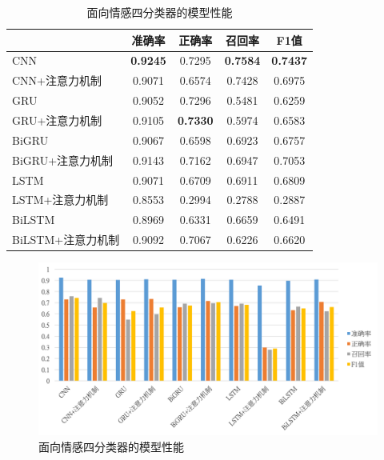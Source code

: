 \begin{table}[htb]
  \centering
  \begin{minipage}[t]{0.8\linewidth}
  \caption{面向情感四分类器的模型性能}
  \label{tab:exp_context_emo_0_result}
    \begin{tabularx}{\linewidth}{X|cccc}
    \toprule[1.5pt]
    & 准确率 & 正确率 & 召回率 & F1值 \\
    \hline
    CNN & \bf 0.9245 & 0.7295 & \bf 0.7584 & \bf 0.7437 \\ %
    CNN+注意力机制 & 0.9071 & 0.6574 & 0.7428 & 0.6975 \\ %
    \hline
    GRU & 0.9052 & 0.7296 & 0.5481 & 0.6259 \\ %
    GRU+注意力机制 & 0.9105 & \bf 0.7330 & 0.5974 & 0.6583 \\ %
    \hline
    BiGRU & 0.9067 & 0.6598 & 0.6923 & 0.6757 \\ %
    BiGRU+注意力机制 & 0.9143 & 0.7162 & 0.6947 & 0.7053 \\ %
    \hline
    LSTM & 0.9071 & 0.6709 & 0.6911 & 0.6809 \\ %
    LSTM+注意力机制 & 0.8553 & 0.2994 & 0.2788 & 0.2887 \\ %
    \hline
    BiLSTM & 0.8969 & 0.6331 & 0.6659 & 0.6491 \\ %
    BiLSTM+注意力机制 & 0.9092 & 0.7067 & 0.6226 & 0.6620 \\ %
    \bottomrule[1.5pt]
    \end{tabularx}
  \end{minipage}
\end{table}

\begin{figure}[H]
  \centering
  \includegraphics[width=\textwidth]{img/exp_context_emo_0_result_bar.png}
  \caption{面向情感四分类器的模型性能}
  \label{fig:exp_context_emo_0_result_bar}
\end{figure}

